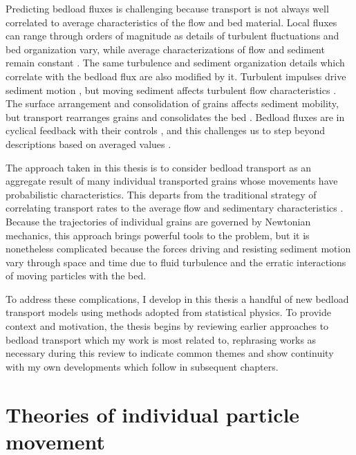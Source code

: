 Predicting bedload fluxes is challenging because transport is not always well correlated to average characteristics of the flow and bed material. 
Local fluxes can range through orders of magnitude as details of turbulent fluctuations and bed organization vary, while average characterizations of flow and sediment remain constant \citep{Sumer2003, Charru2004, Hassan2008, Venditti2017}.
The same turbulence and sediment organization details which correlate with the bedload flux are also modified by it.
Turbulent impulses drive sediment motion \citep{Valyrakis2010, Celik2014, Amir2014, Shih2017}, but moving sediment affects turbulent flow characteristics \citep{Singh2010, Santos2014, Liu2016}. The surface arrangement and consolidation of grains \citep{Miller1966,Paintal1971,Dwivedi2012} affects sediment mobility, but transport rearranges grains and consolidates the bed \citep{Kirchener1990, Charru2004, Allen2018, Masteller2019, Pretzlav2020}.
Bedload fluxes are in cyclical feedback with their controls \citep{Jerolmack2005}, and this challenges us to step beyond descriptions based on averaged values \citep{Ancey2020b}.

The approach taken in this thesis is to consider bedload transport as an aggregate result of many individual transported grains whose movements have probabilistic characteristics.
This departs from the traditional strategy of correlating transport rates to the average flow and sedimentary characteristics \citep{MeyerPeter1948, Parker1990, Wilcock2001}.
Because the trajectories of individual grains are governed by Newtonian mechanics, this approach brings powerful tools to the problem, but it is nonetheless complicated because the forces driving and resisting sediment motion vary through space and time due to fluid turbulence and the erratic interactions of moving particles with the bed.


To address these complications, I develop in this thesis a handful of new bedload transport models using methods adopted from statistical physics.
To provide context and motivation, the thesis begins by reviewing earlier approaches to bedload transport which my work is most related to, rephrasing works as necessary during this review to indicate common themes and show continuity with my own developments which follow in subsequent chapters.

\section{Theories of individual particle movement}
\label{sec:trajmodels}

